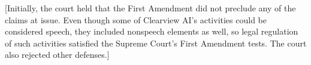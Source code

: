 %
%
%
%
%
%







[Initially, the court held that the First Amendment did not preclude any of the
claims at issue. Even though some of Clearview AI's activities could be
considered speech, they included nonspeech elements as well, so legal regulation
of such activities satisfied the Supreme Court's First Amendment tests. The
court also rejected other defenses.]


